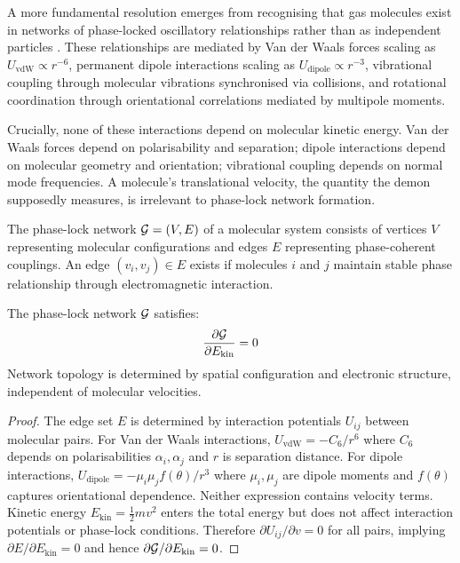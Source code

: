 A more fundamental resolution emerges from recognising that gas molecules exist in networks of phase-locked oscillatory relationships rather than as independent particles \citep{sachikonye2024maxwell}. These relationships are mediated by Van der Waals forces scaling as $U_{\mathrm{vdW}} \propto r^{-6}$, permanent dipole interactions scaling as $U_{\mathrm{dipole}} \propto r^{-3}$, vibrational coupling through molecular vibrations synchronised via collisions, and rotational coordination through orientational correlations mediated by multipole moments.

Crucially, none of these interactions depend on molecular kinetic energy. Van der Waals forces depend on polarisability and separation; dipole interactions depend on molecular geometry and orientation; vibrational coupling depends on normal mode frequencies. A molecule's translational velocity, the quantity the demon supposedly measures, is irrelevant to phase-lock network formation.

\begin{definition}
\label{def:phaselock}
The phase-lock network $\mathcal{G} = (V, E)$ of a molecular system consists of vertices $V$ representing molecular configurations and edges $E$ representing phase-coherent couplings. An edge $(v_i, v_j) \in E$ exists if molecules $i$ and $j$ maintain stable phase relationship through electromagnetic interaction.
\end{definition}

\begin{theorem}
\label{thm:kinetic_independence}
The phase-lock network $\mathcal{G}$ satisfies:
\begin{equation}
\frac{\partial \mathcal{G}}{\partial E_{\mathrm{kin}}} = 0
\end{equation}
Network topology is determined by spatial configuration and electronic structure, independent of molecular velocities.
\end{theorem}

\begin{proof}
The edge set $E$ is determined by interaction potentials $U_{ij}$ between molecular pairs. For Van der Waals interactions, $U_{\mathrm{vdW}} = -C_6/r^6$ where $C_6$ depends on polarisabilities $\alpha_i, \alpha_j$ and $r$ is separation distance. For dipole interactions, $U_{\mathrm{dipole}} = -\mu_i \mu_j f(\theta)/r^3$ where $\mu_i, \mu_j$ are dipole moments and $f(\theta)$ captures orientational dependence. Neither expression contains velocity terms. Kinetic energy $E_{\mathrm{kin}} = \frac{1}{2}m v^2$ enters the total energy but does not affect interaction potentials or phase-lock conditions. Therefore $\partial U_{ij}/\partial v = 0$ for all pairs, implying $\partial E/\partial E_{\mathrm{kin}} = 0$ and hence $\partial \mathcal{G}/\partial E_{\mathrm{kin}} = 0$.
\end{proof}

